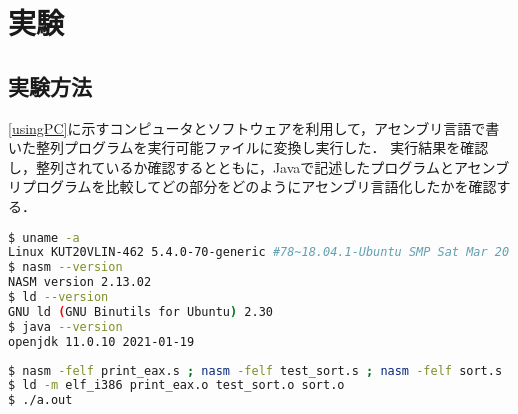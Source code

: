 \section{実験}
\subsection{実験方法}
\ref{usingPC}に示すコンピュータとソフトウェアを利用して，アセンブリ言語で書いた整列プログラムを実行可能ファイルに変換し実行した．
実行結果を確認し，整列されているか確認するとともに，{\ttfamily Java}で記述したプログラムとアセンブリプログラムを比較してどの部分をどのようにアセンブリ言語化したかを確認する．
\begin{lstlisting}[frame={single},numbers={none},breakindent={0pt},language={Bash},caption={使用したコンピュータとソフトウェア},label={usingPC}]
$ uname -a
Linux KUT20VLIN-462 5.4.0-70-generic #78~18.04.1-Ubuntu SMP Sat Mar 20 14:10:07 UTC 2021 x86_64 x86_64 x86_64 GNU/Linux
$ nasm --version
NASM version 2.13.02
$ ld --version
GNU ld (GNU Binutils for Ubuntu) 2.30
$ java --version
openjdk 11.0.10 2021-01-19
\end{lstlisting}
\begin{lstlisting}[frame={single},numbers={none},breakindent={0pt},language={Bash},caption={アセンブル実行コマンド},label={command1}]
$ nasm -felf print_eax.s ; nasm -felf test_sort.s ; nasm -felf sort.s
$ ld -m elf_i386 print_eax.o test_sort.o sort.o
$ ./a.out
\end{lstlisting}
